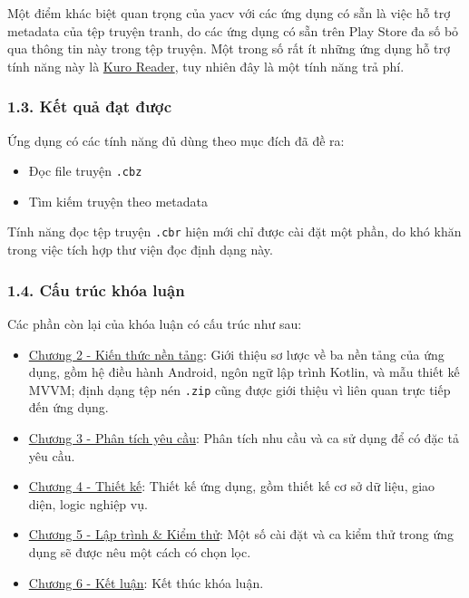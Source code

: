 Một điểm khác biệt quan trọng của yacv với các ứng dụng có sẵn là việc
hỗ trợ metadata của tệp truyện tranh, do các ứng dụng có sẵn trên Play
Store đa số bỏ qua thông tin này trong tệp truyện. Một trong số rất ít
những ứng dụng hỗ trợ tính năng này là
\href{https://play.google.com/store/apps/details?id=br.com.kurotoshiro.leitor_manga\&hl=en\&gl=US}{Kuro
  Reader}, tuy nhiên đây là một tính năng trả phí.

\hypertarget{kux1ebft-quux1ea3-ux111ux1ea1t-ux111ux1b0ux1ee3c}{%
  \subsubsection{\texorpdfstring{1.3. Kết quả đạt được
    }{1.3. Kết quả đạt được }}\label{kux1ebft-quux1ea3-ux111ux1ea1t-ux111ux1b0ux1ee3c}}

Ứng dụng có các tính năng đủ dùng theo mục đích đã đề ra:

\begin{itemize}
  
  \item
        Đọc file truyện \texttt{.cbz}
  \item
        Tìm kiếm truyện theo metadata
\end{itemize}

Tính năng đọc tệp truyện \texttt{.cbr} hiện mới chỉ được cài đặt một
phần, do khó khăn trong việc tích hợp thư viện đọc định dạng này.

\hypertarget{cux1ea5u-truxfac-khuxf3a-luux1eadn}{%
  \subsubsection{\texorpdfstring{1.4. Cấu trúc khóa luận
    }{1.4. Cấu trúc khóa luận }}\label{cux1ea5u-truxfac-khuxf3a-luux1eadn}}

Các phần còn lại của khóa luận có cấu trúc như sau:

\begin{itemize}
  
  \item
        \protect\hyperlink{P2-fundamental}{Chương 2 - Kiến thức nền tảng}:
        Giới thiệu sơ lược về ba nền tảng của ứng dụng, gồm hệ điều hành
        Android, ngôn ngữ lập trình Kotlin, và mẫu thiết kế MVVM; định dạng
        tệp nén \texttt{.zip} cũng được giới thiệu vì liên quan trực tiếp đến
        ứng dụng.
  \item
        \protect\hyperlink{P3-specification}{Chương 3 - Phân tích yêu cầu}:
        Phân tích nhu cầu và ca sử dụng để có đặc tả yêu cầu.
  \item
        \protect\hyperlink{P4-design}{Chương 4 - Thiết kế}: Thiết kế ứng dụng,
        gồm thiết kế cơ sở dữ liệu, giao diện, logic nghiệp vụ.
  \item
        \protect\hyperlink{P5-implementation}{Chương 5 - Lập trình \& Kiểm
          thử}: Một số cài đặt và ca kiểm thử trong ứng dụng sẽ được nêu một
        cách có chọn lọc.
  \item
        \protect\hyperlink{P6-comclusion}{Chương 6 - Kết luận}: Kết thúc khóa
        luận.
\end{itemize}

